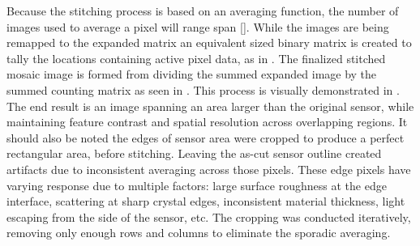 \documentclass[../../main.tex]{subfiles}%
\begin{document}
    Because the stitching process is based on an averaging function, the number of images used to average a pixel will range span \Xvariable[]{[1,K]}[].
    While the images are being remapped to the expanded matrix  an equivalent sized binary matrix  is created to tally the locations containing active pixel data, as in .
    The finalized stitched mosaic image  is formed from dividing the summed expanded image  by the summed counting matrix  as seen in .
    This process is visually demonstrated in .
    The end result is an image spanning an area larger than the original sensor, while maintaining feature contrast and spatial resolution across overlapping regions.
    It should also be noted the edges of sensor area were cropped to produce a perfect rectangular area, before stitching.
    Leaving the as-cut sensor outline created artifacts due to inconsistent averaging across those pixels.
    These edge pixels have varying response due to multiple factors: large surface roughness at the edge interface, scattering at sharp crystal edges, inconsistent material thickness, light escaping from the side of the sensor, etc. 
    The cropping was conducted iteratively, removing only enough rows and columns to eliminate the sporadic averaging.
\end{document}
